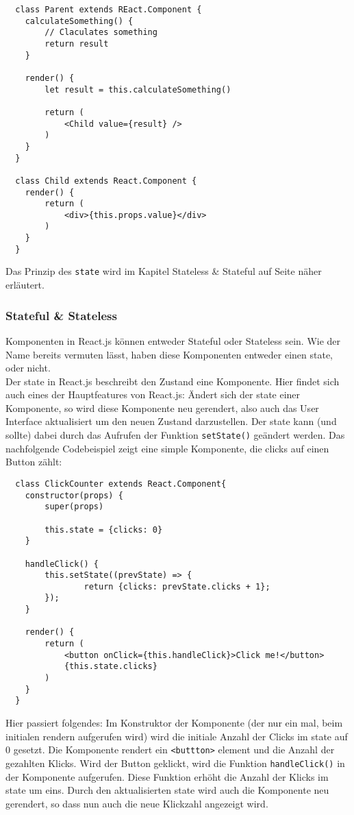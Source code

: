 \begin{lstlisting}
  class Parent extends REact.Component {
  	calculateSomething() {
  		// Claculates something
  		return result
  	}

  	render() {
  		let result = this.calculateSomething()

  		return (
  			<Child value={result} />
  		)
  	}
  }

  class Child extends React.Component {
  	render() {
  		return (
  			<div>{this.props.value}</div>
  		)
  	}
  }
\end{lstlisting}

Das Prinzip des \verb|state| wird im Kapitel Stateless \& Stateful auf Seite \pageref{chap:stateless} näher erläutert.

\subsubsection{Stateful \& Stateless}
\label{chap:stateless}
Komponenten in React.js können entweder Stateful oder Stateless sein. Wie der Name bereits vermuten lässt, haben diese Komponenten entweder  einen state, oder nicht.\\
Der state in React.js beschreibt den Zustand eine Komponente. Hier findet sich auch eines der Hauptfeatures von React.js: Ändert sich der state einer Komponente, so wird diese Komponente neu gerendert, also auch das User Interface aktualisiert um den neuen Zustand darzustellen. Der state kann (und sollte) dabei durch das Aufrufen der Funktion \verb|setState()| geändert werden. Das nachfolgende Codebeispiel zeigt eine simple Komponente, die clicks auf einen Button zählt:

\begin{lstlisting}
  class ClickCounter extends React.Component{
  	constructor(props) {
  		super(props)

  		this.state = {clicks: 0}
  	}

    handleClick() {
  		this.setState((prevState) => {
    			return {clicks: prevState.clicks + 1};
  		});
  	}

  	render() {
  		return (
  			<button onClick={this.handleClick}>Click me!</button>
  			{this.state.clicks}
  		)
  	}
  }
\end{lstlisting}

Hier passiert folgendes: Im Konstruktor der Komponente (der nur ein mal, beim initialen rendern aufgerufen wird) wird die initiale Anzahl der Clicks im state auf 0 gesetzt.
Die Komponente rendert ein \verb|<buttton>| element und die Anzahl der gezahlten Klicks. Wird der Button geklickt, wird die Funktion \verb|handleClick()| in der Komponente aufgerufen. Diese Funktion erhöht die Anzahl der Klicks im state um eins. Durch den aktualisierten state wird auch die Komponente neu gerendert, so dass nun auch die neue Klickzahl angezeigt wird. \\

